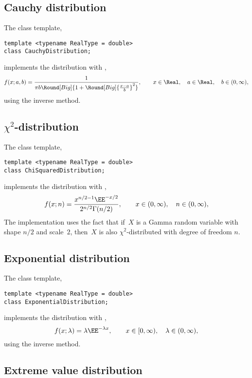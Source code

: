 \subsection{Cauchy distribution}
\label{sub:Cauchy distribution}

The class template,
\begin{verbatim}
template <typename RealType = double>
class CauchyDistribution;
\end{verbatim}
implements the distribution with \pdf,
\begin{equation*}
  f(x;a,b) =
  \frac{1}{\pi b\Round[Big]{1 + \Round[Big]{\frac{x - a}{b}}^2}},\qquad
  x \in \Real,\quad a \in \Real,\quad b \in (0,\infty),
\end{equation*}
using the inverse method.

\subsection{\texorpdfstring{$\chi^2$}{Chi-squared}-distribution}
\label{Chi-squared-distribution}

The class template,
\begin{verbatim}
template <typename RealType = double>
class ChiSquaredDistribution;
\end{verbatim}
implements the distribution with \pdf,
\begin{equation*}
  f(x;n) = \frac{x^{n/2 - 1}\EE^{-x/2}}{2^{n/2}\Gamma(n/2)},\qquad
  x \in (0,\infty),\quad n \in (0,\infty),
\end{equation*}
The implementation uses the fact that if~$X$ is a Gamma random variable with
shape $n / 2$ and scale~$2$, then~$X$ is also $\chi^2$-distributed with degree
of freedom $n$.

\subsection{Exponential distribution}
\label{sub:Exponential distribution}

The class template,
\begin{verbatim}
template <typename RealType = double>
class ExponentialDistribution;
\end{verbatim}
implements the distribution with \pdf,
\begin{equation*}
  f(x;\lambda) = \lambda\EE^{-\lambda x},\qquad
  x \in [0,\infty),\quad \lambda \in (0,\infty),
\end{equation*}
using the inverse method.

\subsection{Extreme value distribution}
\label{sub:Extreme value distribution}

